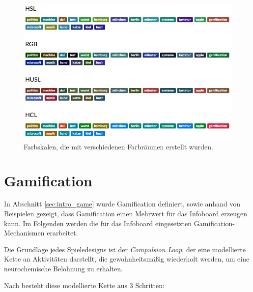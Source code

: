 \documentclass[12pt,twoside]{book}
\begin{document}
\begin{figure}[htbp]
    \centering
    \includegraphics[width=1.0\textwidth]{images/colors}
    \caption{Farbskalen, die mit verschiedenen Farbräumen erstellt wurden.}
    \label{fig:colors}
\end{figure}

\section{Gamification}


In Abschnitt \ref{sec:intro_game} wurde Gamification definiert, sowie anhand von Beispielen gezeigt, dass Gamification einen Mehrwert für das Infoboard erzeugen kann. Im Folgenden werden die für das Infoboard eingesetzten Gamification-Mechanismen erarbeitet.

Die Grundlage jedes Spieledesigns ist der \textit{Compulsion Loop}, der eine modellierte Kette an Aktivitäten darstellt, die gewohnheitsmäßig wiederholt werden, um eine neurochemische Belohnung zu erhalten.

Nach \citep{gamasutra} besteht diese modellierte Kette aus 3 Schritten:
\end{document}
